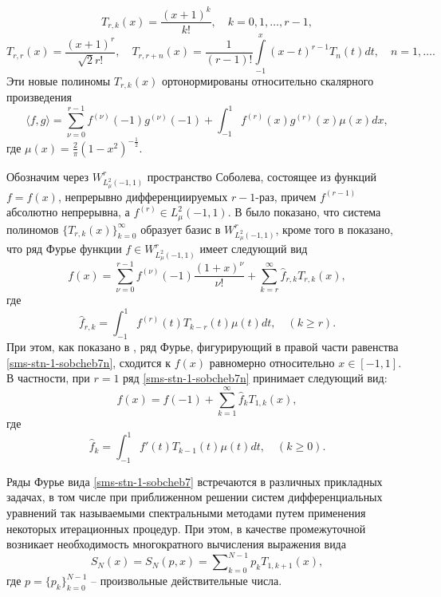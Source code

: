 \begin{equation}\label{sms-stn-1-sobcheb3}
T_{r,k}(x) =\frac{(x+1)^k}{k!}, \quad k=0,1,\ldots, r-1,
\end{equation}
\begin{equation}\label{sms-stn-1-sobcheb4}
T_{r,r}(x) =\frac{(x+1)^r}{\sqrt{2}r!},\quad T_{r,r+n}(x) =\frac{1}{(r-1)!}\int\limits_{-1}^x(x-t)^{r-1}T_{n}(t)dt, \quad n=1,\ldots.
\end{equation}
Эти новые полиномы $T_{r,k}(x)$ ортонормированы \cite{sms-stn-1-SharIzVuz} относительно скалярного произведения
\begin{equation}\label{sms-stn-1-sobcheb2}
\langle f,g\rangle=\sum_{\nu=0}^{r-1}f^{(\nu)}(-1)g^{(\nu)}(-1)+\int_{-1}^{1}f^{(r)}(x)g^{(r)}(x)\mu(x)dx,
\end{equation}
где $\mu(x)=\frac2\pi(1-x^2)^{-\frac12}$.

Обозначим через $W^r_{L^2_\mu(-1,1)}$ пространство Соболева, состоящее  из  функций $f=f(x)$, непрерывно дифференциируемых $r-1$-раз, причем $f^{(r-1)}$ абсолютно непрерывна, а $f^{(r)}\in L^2_\mu(-1,1)$.
В \cite{sms-stn-1-SharIzVuz} было показано, что система полиномов $\{T_{r,k}(x)\}_{k=0}^\infty$ образует базис в $W^r_{L^2_\mu(-1,1)}$, кроме того в \cite{sms-stn-1-SharIzVuz} показано, что ряд Фурье функции $f\in W^r_{L^2_\mu(-1,1)}$ имеет следующий вид
\begin{equation}\label{sms-stn-1-sobcheb7n}
f(x)=\sum_{\nu=0}^{r-1}f^{(\nu)}(-1)\frac{(1+x)^\nu}{\nu!}+ \sum_{k=r}^\infty \hat f_{r,k}T_{r,k}(x),
\end{equation}
где
\begin{equation}\label{sms-stn-1-sobcheb8n}
\hat f_{r,k}=\int_{-1}^1 f^{(r)}(t)T_{k-r}(t)\mu(t)dt,\quad(k\ge r).
\end{equation}
При этом, как показано в \cite{sms-stn-1-SharIzVuz}, ряд Фурье, фигурирующий в правой части равенства \eqref{sms-stn-1-sobcheb7n}, сходится к $f(x)$ равномерно относительно $x\in[-1,1]$.
В частности, при $r=1$ ряд \eqref{sms-stn-1-sobcheb7n} принимает следующий вид:
\begin{equation}\label{sms-stn-1-sobcheb7}
f(x)= f(-1)+ \sum_{k=1}^\infty \hat f_{k}T_{1,k}(x),
\end{equation}
где
\begin{equation}\label{sms-stn-1-sobcheb8}
\hat f_{k}=\int_{-1}^1 f'(t)T_{k-1}(t)\mu(t)dt,\quad(k\ge0).
\end{equation}

Ряды Фурье вида \eqref{sms-stn-1-sobcheb7} встречаются в различных прикладных задачах, в том числе при приближенном решении систем дифференциальных уравнений так называемыми спектральными методами путем применения некоторых итерационных процедур. При этом, в качестве промежуточной возникает необходимость многократного вычисления выражения вида
\begin{equation}\label{sms-stn-1-2.1}
S_N(x) =  S_N(p, x) = \sum\nolimits_{k=0}^{N-1}p_kT_{1,k+1}(x),
\end{equation}
где $p=\{ p_k \}_{k=0}^{N-1}$ -- произвольные действительные числа.

